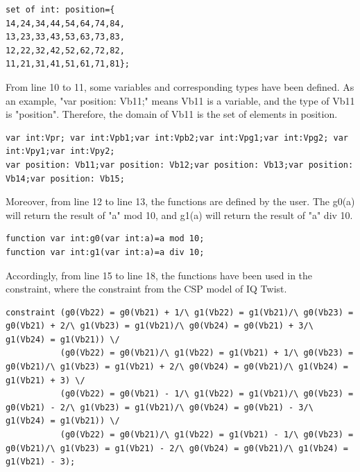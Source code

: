 \begin{lstlisting}[language=minizinc,firstnumber=5]
set of int: position={
14,24,34,44,54,64,74,84,
13,23,33,43,53,63,73,83,
12,22,32,42,52,62,72,82,
11,21,31,41,51,61,71,81};
\end{lstlisting}
From line 10 to 11, some variables and corresponding types have been defined. As an example, "var position: Vb11;" means Vb11 is a variable, and the type of Vb11 is "position". Therefore, the domain of Vb11 is the set of elements in position.
\begin{lstlisting}[language=minizinc,firstnumber=10]
var int:Vpr; var int:Vpb1;var int:Vpb2;var int:Vpg1;var int:Vpg2; var int:Vpy1;var int:Vpy2;
var position: Vb11;var position: Vb12;var position: Vb13;var position: Vb14;var position: Vb15;
\end{lstlisting}
Moreover, from line 12 to line 13, the functions are defined by the user. The g0(a) will return the result of "a" mod 10, and g1(a) will return the result of "a" div 10.
\begin{lstlisting}[language=minizinc,firstnumber=12]
function var int:g0(var int:a)=a mod 10;
function var int:g1(var int:a)=a div 10;
\end{lstlisting}
Accordingly, from line 15 to line 18, the functions have been used in the constraint, where the constraint from the CSP model of IQ Twist.
\begin{lstlisting}[language=minizinc,firstnumber=14]
%blue piece2 
constraint (g0(Vb22) = g0(Vb21) + 1/\ g1(Vb22) = g1(Vb21)/\ g0(Vb23) = g0(Vb21) + 2/\ g1(Vb23) = g1(Vb21)/\ g0(Vb24) = g0(Vb21) + 3/\ g1(Vb24) = g1(Vb21)) \/
           (g0(Vb22) = g0(Vb21)/\ g1(Vb22) = g1(Vb21) + 1/\ g0(Vb23) = g0(Vb21)/\ g1(Vb23) = g1(Vb21) + 2/\ g0(Vb24) = g0(Vb21)/\ g1(Vb24) = g1(Vb21) + 3) \/
           (g0(Vb22) = g0(Vb21) - 1/\ g1(Vb22) = g1(Vb21)/\ g0(Vb23) = g0(Vb21) - 2/\ g1(Vb23) = g1(Vb21)/\ g0(Vb24) = g0(Vb21) - 3/\ g1(Vb24) = g1(Vb21)) \/
           (g0(Vb22) = g0(Vb21)/\ g1(Vb22) = g1(Vb21) - 1/\ g0(Vb23) = g0(Vb21)/\ g1(Vb23) = g1(Vb21) - 2/\ g0(Vb24) = g0(Vb21)/\ g1(Vb24) = g1(Vb21) - 3);
\end{lstlisting}

